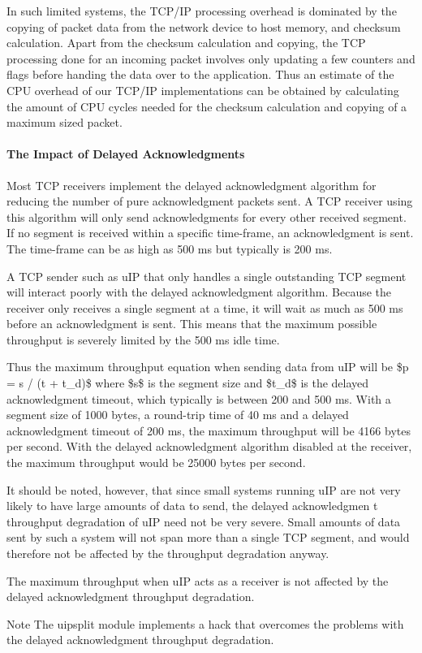 \-In such limited systems, the \-T\-C\-P/\-I\-P processing overhead is dominated by the copying of packet data from the network device to host memory, and checksum calculation. \-Apart from the checksum calculation and copying, the \-T\-C\-P processing done for an incoming packet involves only updating a few counters and flags before handing the data over to the application. \-Thus an estimate of the \-C\-P\-U overhead of our \-T\-C\-P/\-I\-P implementations can be obtained by calculating the amount of \-C\-P\-U cycles needed for the checksum calculation and copying of a maximum sized packet.\hypertarget{a00060_delack}{}\paragraph{\-The Impact of Delayed Acknowledgments}\label{a00060_delack}
\-Most \-T\-C\-P receivers implement the delayed acknowledgment algorithm for reducing the number of pure acknowledgment packets sent. \-A \-T\-C\-P receiver using this algorithm will only send acknowledgments for every other received segment. \-If no segment is received within a specific time-\/frame, an acknowledgment is sent. \-The time-\/frame can be as high as 500 ms but typically is 200 ms.

\-A \-T\-C\-P sender such as u\-I\-P that only handles a single outstanding \-T\-C\-P segment will interact poorly with the delayed acknowledgment algorithm. \-Because the receiver only receives a single segment at a time, it will wait as much as 500 ms before an acknowledgment is sent. \-This means that the maximum possible throughput is severely limited by the 500 ms idle time.

\-Thus the maximum throughput equation when sending data from u\-I\-P will be \$p = s / (t + t\-\_\-d)\$ where \$s\$ is the segment size and \$t\-\_\-d\$ is the delayed acknowledgment timeout, which typically is between 200 and 500 ms. \-With a segment size of 1000 bytes, a round-\/trip time of 40 ms and a delayed acknowledgment timeout of 200 ms, the maximum throughput will be 4166 bytes per second. \-With the delayed acknowledgment algorithm disabled at the receiver, the maximum throughput would be 25000 bytes per second.

\-It should be noted, however, that since small systems running u\-I\-P are not very likely to have large amounts of data to send, the delayed acknowledgmen t throughput degradation of u\-I\-P need not be very severe. \-Small amounts of data sent by such a system will not span more than a single \-T\-C\-P segment, and would therefore not be affected by the throughput degradation anyway.

\-The maximum throughput when u\-I\-P acts as a receiver is not affected by the delayed acknowledgment throughput degradation.

\begin{DoxyNote}{\-Note}
\-The uipsplit module implements a hack that overcomes the problems with the delayed acknowledgment throughput degradation. 
\end{DoxyNote}
